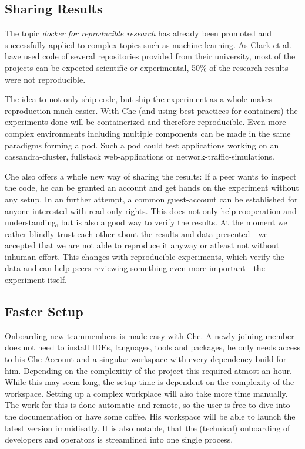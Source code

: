 \documentclass[utf8]{lni}
\begin{document}
\subsection{Sharing Results}
The topic \textit{docker for reproducible research} has already been promoted \cite{BO15} and successfully applied to complex topics \cite{ST16} such as machine learning. 
As Clark et al. \cite{CL14} have used code of several repositories provided from their university, most of the projects can be expected scientific or experimental, 50\% of the research results were not reproducible. 

The idea to not only ship code, but ship the experiment as a whole makes reproduction much easier. 
With Che (and using best practices for containers) the experiments done will be containerized and therefore reproducible. 
Even more complex environments including multiple components can be made in the same paradigms forming a pod. 
Such a pod could test applications working on an cassandra-cluster, fullstack web-applications or network-traffic-simulations.  

Che also offers a whole new way of sharing the results: 
If a peer wants to inspect the code, he can be granted an account and get hands on the experiment without any setup. 
In an further attempt, a common guest-account can be established for anyone interested with read-only rights. 
This does not only help cooperation and understanding, but is also a good way to verify the results. 
At the moment we rather blindly trust each other about the results and data presented - we accepted that we are not able to reproduce it anyway or atleast not without inhuman effort. This changes with reproducible experiments, which verify the data and can help peers reviewing something even more important - the experiment itself. 
\subsection{Faster Setup}
Onboarding new teammembers is made easy with Che. 
A newly joining member does not need to install IDEs, languages, tools and packages, he only needs access to his Che-Account and a singular workspace with every dependency build for him.
Depending on the complexitiy of the project this required atmost an hour. 
While this may seem long, the setup time is dependent on the complexity of the workspace. 
Setting up a complex workplace will also take more time manually. 
The work for this is done automatic and remote, so the user is free to dive into the documentation or have some coffee. 
His workspace will be able to launch the latest version immidieatly.
It is also notable, that the (technical) onboarding of developers and operators is streamlined into one single process. 
\end{document}
